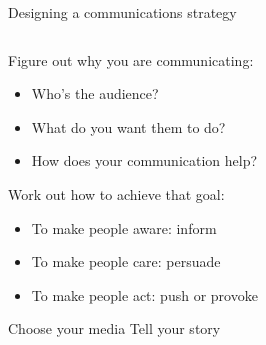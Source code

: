 \begin{frame}{Designing a communications strategy}

\begin{columns}

    \begin{column}{0.45\textwidth}
        \begin{minipage}[t][.7\textheight]{\textwidth}
        
        Figure out why you are communicating:
        \begin{itemize}
            \item Who's the audience?
            \item What do you want them to do?
            \item How does your communication help?
        \end{itemize}
        \vfill
        Work out how to achieve that goal:
        \begin{itemize}
            \item To make people aware: inform
            \item To make people care: persuade
            \item To make people act: push or provoke
        \end{itemize}
        \vfill
        Choose your media
        \vfill
        Tell your story
        \end{minipage}
    \end{column}

    \begin{column}{0.45\textwidth}

    \end{column}

\end{columns}



\begin{frame}[plain]
    
    \centering
    
    
    \end{frame}

\end{frame}